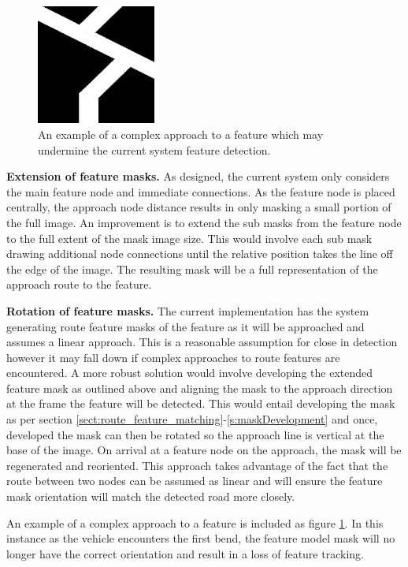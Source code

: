 \documentclass[]{aiaa-tc}%
\begin{document}
\begin{figure} %
	\centering
	\includegraphics[width=0.35\textwidth]{complexFeatureApproach.png}
	\caption{An example of a complex approach to a feature which may undermine the current system feature detection.}
	\label{f:complexFeatureApproach}
\end{figure}

\textbf{Extension of feature masks.} As designed, the current system only considers the main feature node and immediate connections. As the feature node is placed centrally, the approach node distance results in only masking a small portion of the full image. An improvement is to extend the sub masks from the feature node to the full extent of the mask image size. This would involve each sub mask drawing additional node connections until the relative position takes the line off the edge of the image. The resulting mask will be a full representation of the approach route to the feature.

\textbf{Rotation of feature masks.} The current implementation has the system generating route feature masks of the feature as it will be approached and assumes a linear approach. This is a reasonable assumption for close in detection however it may fall down if complex approaches to route features are encountered. A more robust solution would involve developing the extended feature mask as outlined above and aligning the mask to the approach direction at the frame the feature will be detected. This would entail developing the mask as per section \ref{sect:route_feature_matching}-\ref{s:maskDevelopment} and once, developed the mask can then be rotated so the approach line is vertical at the base of the image. On arrival at a feature node on the approach, the mask will be regenerated and reoriented. This approach takes advantage of the fact that the route between two nodes can be assumed as linear and will ensure the feature mask orientation will match the detected road more closely. 

An example of a complex approach to a feature is included as figure \ref{f:complexFeatureApproach}. In this instance as the vehicle encounters the first bend, the feature model mask will no longer have the correct orientation and result in a loss of feature tracking. 
\end{document}
